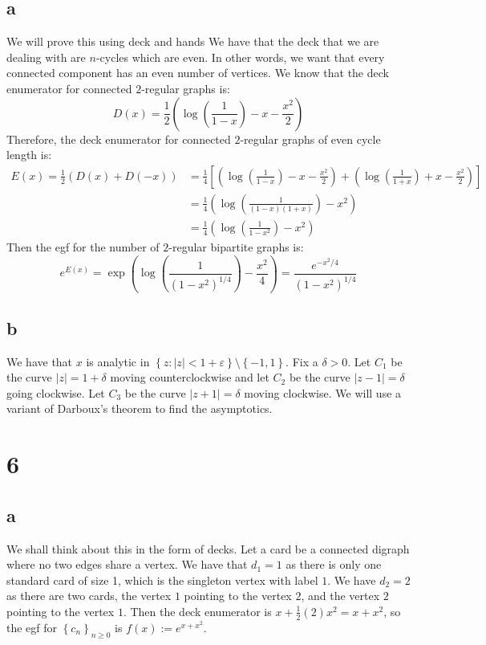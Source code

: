 \documentclass[]{article}
\begin{document}
\subsection{a}
We will prove this using deck and hands
We have that the deck that we are dealing with are $n$-cycles which are even. In other words, we want that every connected component has an even number of vertices. We know that the deck enumerator for connected $2$-regular graphs is:
\begin{equation}
	D(x) = \frac{1}{2}\left(\log\left(\frac{1}{1 - x}\right) - x - \frac{x^2}{2}\right)
\end{equation}
Therefore, the deck enumerator for connected $2$-regular graphs of even cycle length is:
\begin{align}
	E(x) = \frac{1}{2} \left(D(x) + D(-x)\right) &= \frac{1}{4} \left[ \left(\log\left(\frac{1}{1 - x}\right) - x - \frac{x^2}{2}\right) + \left(\log\left(\frac{1}{1 + x}\right) + x - \frac{x^2}{2}\right) \right]\\
	&=\frac{1}{4} \left(\log\left(\frac{1}{(1 - x)(1 + x)}\right) - x^2\right) \\
	&=\frac{1}{4} \left(\log\left(\frac{1}{1 - x^2}\right)- x^2\right) 
\end{align}
Then the egf for the number of $2$-regular bipartite graphs is:
\begin{equation}
	e^{E(x)} = \exp\left(\log\left(\frac{1}{(1 - x^2)^{1/4}}\right)- \frac{x^2}{4}\right)  = \frac{e^{-x^2/4}}{(1 - x^2)^{1/4}}
\end{equation}

\subsection{b}
We have that $x$ is analytic in $\left\{ z: |z| < 1 + \varepsilon \right\} \setminus \left\{ -1, 1 \right\}$. Fix a $\delta > 0$. Let $C_1$ be the curve $|z| = 1 + \delta$ moving counterclockwise  and let $C_2$ be the curve $|z - 1| = \delta$ going clockwise. Let $C_3$ be the curve $|z + 1| = \delta$ moving clockwise. We will use a variant of Darboux's theorem to find the asymptotics.
\section{6}
\subsection{a}
We shall think about this in the form of decks. Let a card be a connected digraph where no two edges share a vertex. We have that $d_1 = 1$ as there is only one standard card of size 1, which is the singleton vertex with label $1$. We have $d_2 = 2$ as there are two cards, the vertex $1$ pointing to the vertex $2$, and the vertex $2$ pointing to the vertex $1$. Then the deck enumerator is $x + \frac{1}{2} (2) x^2 = x + x^2$, so the egf for $\left\{ c_n\right\}_{n \geq 0}$ is $f(x) := e^{x + x^2}$.
\end{document}
